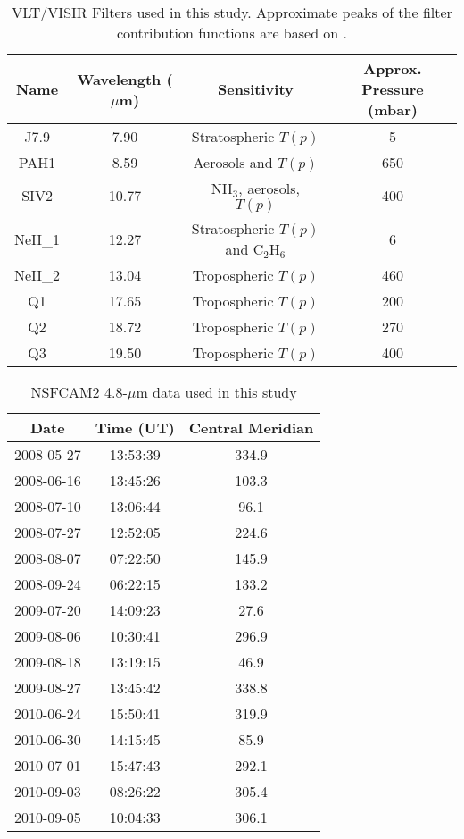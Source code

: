 \documentclass[final,5p,times,twocolumn,authoryear]{elsarticle}
\begin{document}
\begin{table*}[htdp]
\caption{VLT/VISIR Filters used in this study.  Approximate peaks of the filter contribution functions are based on \citet{09fletcher_imaging}.}
\begin{center}
\begin{tabular}{|c|c|c|c|}
\hline
Name & Wavelength ($\mu$m) & Sensitivity & Approx. Pressure (mbar) \\
\hline
J7.9 & 7.90 & Stratospheric $T(p)$ & 5 \\
PAH1 & 8.59 & Aerosols and $T(p)$ & 650\\
SIV2 & 10.77 & NH$_3$, aerosols, $T(p)$ & 400 \\
NeII\_1 & 12.27 & Stratospheric $T(p)$ and C$_2$H$_6$ & 6 \\
NeII\_2 & 13.04 & Tropospheric $T(p)$ & 460 \\
Q1 & 17.65 & Tropospheric $T(p)$ & 200 \\
Q2 & 18.72 & Tropospheric $T(p)$ & 270 \\
Q3 & 19.50 & Tropospheric $T(p)$ & 400 \\
\hline
\end{tabular}
\end{center}
\label{tab:filters}
\end{table*}%

\begin{table}[htdp]
\caption{NSFCAM2 4.8-$\mu$m data used in this study}
\begin{center}
\begin{tabular}{|c|c|c|}
\hline
Date & Time (UT) & Central Meridian \\
\hline
2008-05-27 & 13:53:39 &      334.9 \\
2008-06-16 & 13:45:26 &      103.3 \\
2008-07-10 & 13:06:44 &      96.1 \\
2008-07-27 & 12:52:05 &      224.6 \\
2008-08-07 & 07:22:50 &      145.9 \\
2008-09-24 & 06:22:15 &      133.2 \\
2009-07-20 & 14:09:23 &      27.6 \\
2009-08-06 & 10:30:41 &      296.9 \\
2009-08-18 & 13:19:15 &      46.9 \\
2009-08-27 & 13:45:42 &      338.8 \\
2010-06-24 & 15:50:41 &      319.9 \\
2010-06-30 & 14:15:45 &      85.9 \\
2010-07-01 & 15:47:43 &      292.1 \\
2010-09-03 & 08:26:22 &      305.4 \\
2010-09-05 & 10:04:33 &      306.1 \\
\hline
\end{tabular}
\end{center}
\label{tab:nsfcam}
\end{table}%
\end{document}
